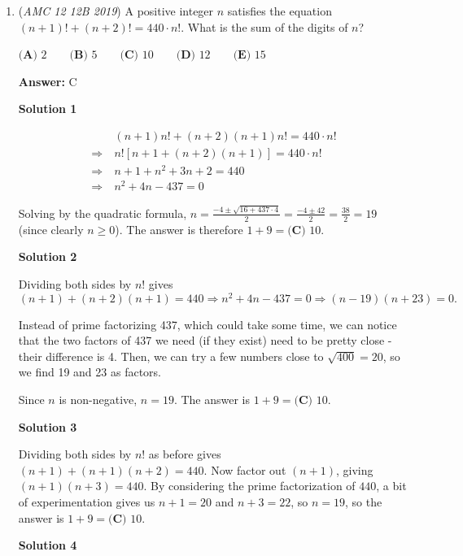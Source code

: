 \begin{enumerate}
 


	\item (\textit{AMC 12 12B 2019}) A positive integer $n$ satisfies the equation $(n+1)!+(n+2)!=440\cdot n!$. What is the sum of the digits of $n$?


 $\textbf{(A) } 2 \qquad \textbf{(B) } 5 \qquad \textbf{(C) } 10\qquad \textbf{(D) } 12 \qquad \textbf{(E) } 15$

 \textbf{Answer: }C



\textbf{Solution 1}


 \[\begin{split}& (n+1)n! + (n+2)(n+1)n! = 440 \cdot n! \\ \Rightarrow \ &n![n+1 + (n+2)(n+1)] = 440 \cdot n! \\ \Rightarrow \ &n + 1 + n^2 + 3n + 2 = 440 \\ \Rightarrow \ &n^2 + 4n - 437 = 0\end{split}\]

 Solving by the quadratic formula, $n = \frac{-4\pm \sqrt{16+437\cdot4}}{2} = \frac{-4\pm 42}{2} = \frac{38}{2} = 19$ (since clearly $n \geq 0$). The answer is therefore $1 + 9 = \boxed{\textbf{(C) }10}$.

 



\textbf{Solution 2}

Dividing both sides by $n!$ gives
 \[(n+1)+(n+2)(n+1)=440 \Rightarrow n^2+4n-437=0 \Rightarrow (n-19)(n+23)=0.\]

 Instead of prime factorizing 437, which could take some time, we can notice that the two factors of 437 we need (if they exist) need to be pretty close - their difference is 4. Then, we can try a few numbers close to $\sqrt{400} = 20$, so we find 19 and 23 as factors.

 Since $n$ is non-negative, $n=19$. The answer is $1 + 9 = \boxed{\textbf{(C) }10}$.

 



\textbf{Solution 3}

Dividing both sides by $n!$ as before gives $(n+1)+(n+1)(n+2)=440$. Now factor out $(n+1)$, giving $(n+1)(n+3)=440$. By considering the prime factorization of $440$, a bit of experimentation gives us $n+1=20$ and $n+3=22$, so $n=19$, so the answer is $1 + 9 = \boxed{\textbf{(C) }10}$.

 



\textbf{Solution 4}


\end{enumerate}
